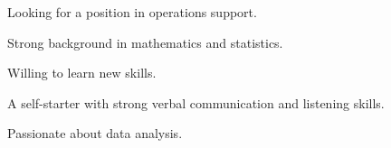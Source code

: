 

\begin{cventries}

  \cventry
    {} %
    {} %
    {} %
    {} %
    {
      \begin{cvitems} %
      \item Looking for a position in operations support.
      \item Strong background in mathematics and statistics.
      \item Willing to learn new skills.
      \item A self-starter with strong verbal communication and listening skills.
      \item Passionate about data analysis. 
      \end{cvitems}
    }


\end{cventries}
